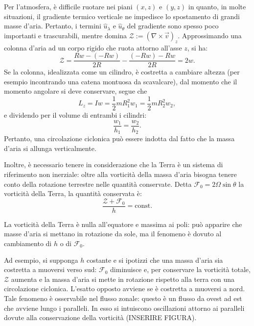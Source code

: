 Per l'atmosfera, è difficile ruotare nei piani $(x,z)$ e $(y,z)$ in quanto, in molte situazioni, il gradiente termico verticale ne impedisce lo spostamento di grandi masse d'aria. Pertanto, i termini $\hat{u}_\lambda$ e $\hat{u}_\theta$ del gradiente sono spesso poco importanti e trascurabili, mentre domina $\mathcal{Z}:=(\nabla\times\vec{v})_z$. Approssimando una colonna d'aria ad un corpo rigido che ruota attorno all'asse $z$, si ha:
\begin{equation}
	\mathcal{Z}=\frac{Rw-(-Rw)}{2R}-\frac{(-Rw)-Rw}{2R}=2w.
\end{equation}
Se la colonna, idealizzata come un cilindro, è costretta a cambiare altezza (per esempio incontrando una catena montuosa da scavalcare), dal momento che il momento angolare si deve conservare, segue che
\begin{equation}
	L_z=Iw=\frac{1}{2}mR^2_1w_1=\frac{1}{2}mR^2_2w_2,
\end{equation}
e dividendo per il volume di entrambi i cilindri:
\begin{equation}
	\frac{w_1}{h_1}=\frac{w_2}{h_2}.
\end{equation}
Pertanto, una circolazione ciclonica può essere indotta dal fatto che la massa d'aria si allunga verticalmente. 

Inoltre, è necessario tenere in considerazione che la Terra è un sistema di riferimento non inerziale: oltre alla vorticità della massa d'aria bisogna tenere conto della rotazione terrestre nelle quantità conservate. Detta $\mathcal{F}_0=2\Omega\sin\theta$ la vorticità della Terra, la quantità conservata è:
\begin{equation}
	\frac{\mathcal{Z}+\mathcal{F}_0}{h}=\text{const}.
\end{equation}

La vorticità della Terra è nulla all'equatore e massima ai poli: può apparire che masse d'aria si mettano in rotazione da sole, ma il fenomeno è dovuto al cambiamento di $h$ o di $\mathcal{F}_0$.

Ad esempio, si supponga $h$ costante e si ipotizzi che una massa d'aria sia costretta a muoversi verso sud: $\mathcal{F}_0$ diminuisce e, per conservare la vorticità totale, $\mathcal{Z}$ aumenta e la massa d'aria si mette in rotazione rispetto alla terra con una circolazione ciclonica. L'esatto opposto avviene se è costretta a muoversi a nord. Tale fenomeno è osservabile nel flusso zonale: questo è un flusso da ovest ad est che avviene lungo i paralleli. In esso si intuiscono oscillazioni attorno ai paralleli dovute alla conservazione della vorticità (INSERIRE FIGURA).